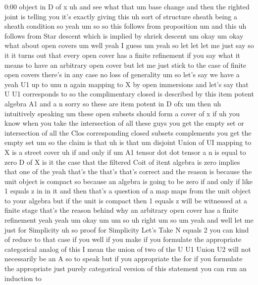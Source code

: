 \begin{unfinished}{0:00}
object  in  D  of
x  uh  and  see  what  that  um  base  change
and  then  the  righted  joint  is  telling
you  it's  exactly  giving  this  uh  sort  of
structure  sheath  being  a  sheath
condition  so  yeah  um
so  so  this  follows  from
proposition
um  and  this  uh  follows  from  Star
descent  which  is  implied  by  shriek
descent
um
okay
um  okay  what  about  open
covers
um
well  yeah  I
guess  um  yeah  so  let  let  let  me  just  say
so  it  it  turns  out  that  every  open  cover
has  a  finite  refinement  if  you  say  what
it  means  to  have  an  arbitrary  open  cover
but  let  me  just  stick  to  the  case  of
finite  open  covers  there's  in  any  case
no  loss  of  generality  um  so  let's  say  we
have  a  yeah  U1  up  to  unu  n  again  mapping
to  X  by  open
immersions  and  let's  say  that  U  U1
corresponds  to  so  the  complimentary
closed  is  described  by  this  item  potent
algebra  A1  and  a  n  sorry  so  these  are
item  potent  in  D  ofx
um  then  uh  intuitively  speaking  um  these
open  subsets  should  form  a  cover  of  x  if
uh  you  know  when  you  take  the
intersection  of  all  these  guys  you  get
the  empty  set  or  intersection  of  all  the
Clos  corresponding  closed  subsets
complements  you  get  the  empty  set  um  so
the  claim  is
that  uh  is  that  um  disjoint  Union  of  UI
mapping  to  X  is  a  street
cover  uh  if  and  only  if  um  A1  tensor  dot
dot  tensor  a  n  is  equal  to  zero  D  of
X  is  it  the  case  that  the  filtered  Coit
of  itent  algebra  is  zero  implies  that
one  of
the  yeah  that's  the  that's  that's
correct  and  the  reason  is  because  the
unit  object  is  compact  so  because  an
algebra  is  going  to  be  zero  if  and  only
if  like  1  equals  z  in  in  it  and  then
that's  a  question  of  a  map  maps  from  the
unit  object  to  your  algebra  but  if  the
unit  is  compact  then  1  equals  z  will  be
witnessed  at  a  finite  stage  that's  the
reason  behind  why  an  arbitrary  open
cover  has  a  finite  refinement
yeah  yeah
um
okay  um  um
so
uh  right
um
so  um  yeah  and  well  let  me  just  for
Simplicity  uh  so  proof  for  Simplicity
Let's  Take  N  equals  2  you  can  kind  of
reduce  to  that  case  if  you  well  if  you
make  if  you  formulate  the  appropriate
categorical  analog  of  this  I  mean  the
union  of  two  of  the
U  U1  Union  U2  will  not  necessarily  be  an
A  so  to  speak  but  if  you  appropriate  the
for  if  you  formulate  the  appropriate
just  purely  categorical  version  of  this
statement  you  can  run  an  induction  to

\end{unfinished}
